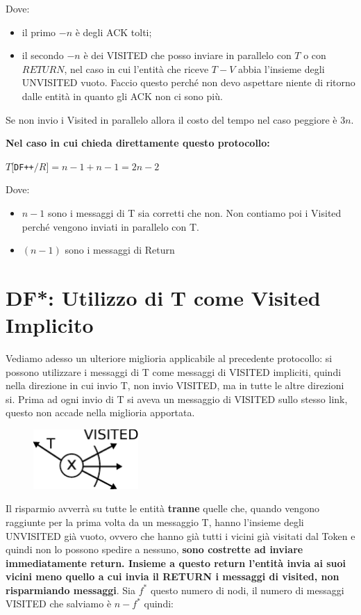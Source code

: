 Dove:
\begin{itemize}
    \item il primo $-n$ è degli ACK tolti;
    \item il secondo $-n$ è dei VISITED che posso inviare in parallelo con $T$ o
          con $RETURN$, nel caso in cui l'entità che riceve $T-V$ abbia l'insieme degli
          UNVISITED vuoto. Faccio questo perché non devo aspettare niente di ritorno
          dalle entità in quanto gli ACK non ci sono più.
\end{itemize}
Se non invio i Visited in parallelo allora il costo del tempo nel caso peggiore
è $3n$.

\textbf{Nel caso in cui chieda direttamente questo protocollo:}
\begin{center}
    $T[$\texttt{DF++}$/R] = n-1 + n-1 = 2n - 2$
\end{center}
Dove:
\begin{itemize}
    \item $n-1$ sono i messaggi di T sia corretti che non. Non contiamo poi i
          Visited perché vengono inviati in parallelo con T.
    \item $(n-1)$ sono i messaggi di Return
\end{itemize}

\section{DF*: Utilizzo di T come Visited Implicito}
Vediamo adesso un ulteriore miglioria applicabile al precedente protocollo: si
possono utilizzare i messaggi di T come messaggi di VISITED impliciti, quindi
nella direzione in cui invio T, non invio VISITED, ma in tutte le altre
direzioni si. Prima ad ogni invio di T si aveva un messaggio di VISITED sullo
stesso link, questo non accade nella miglioria apportata.

\begin{figure}[H]
    \centering
    \includegraphics[width=4cm, keepaspectratio]{images/n_19}
\end{figure}

Il risparmio avverrà su tutte le entità \textbf{tranne} quelle che, quando
vengono raggiunte per la prima volta da un messaggio T, hanno l'insieme degli
UNVISITED già vuoto, ovvero che hanno già tutti i vicini già visitati dal Token
e quindi non lo possono spedire a nessuno, \textbf{sono costrette ad inviare
    immediatamente return. Insieme a questo return l'entità invia ai suoi vicini
    meno quello a cui invia il RETURN i messaggi di visited, non risparmiando
    messaggi}. Sia $f^*$ questo numero di nodi, il numero di messaggi VISITED che
salviamo è $n-f^*$ quindi:

